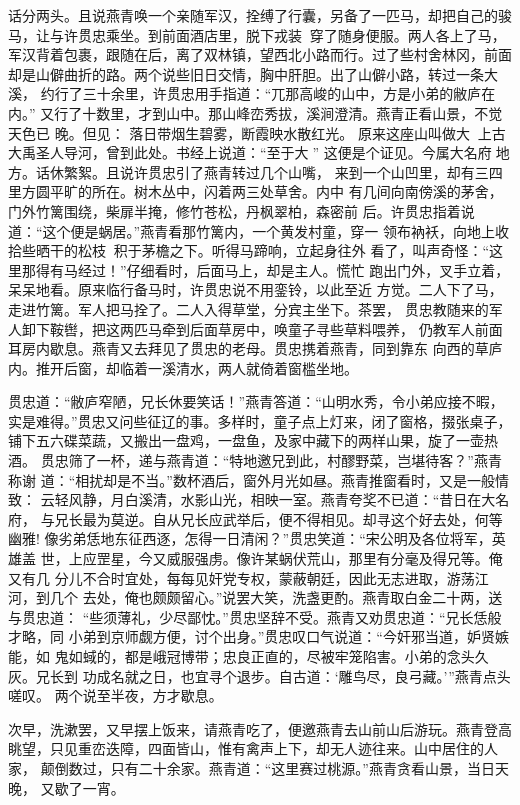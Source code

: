 话分两头。且说燕青唤一个亲随军汉，拴缚了行囊，另备了一匹马，却把自己的骏
马，让与许贯忠乘坐。到前面酒店里，脱下戎装，穿了随身便服。两人各上了马，
军汉背着包裹，跟随在后，离了双林镇，望西北小路而行。过了些村舍林冈，前面
却是山僻曲折的路。两个说些旧日交情，胸中肝胆。出了山僻小路，转过一条大溪，
约行了三十余里，许贯忠用手指道：“兀那高峻的山中，方是小弟的敝庐在内。”
又行了十数里，才到山中。那山峰峦秀拔，溪涧澄清。燕青正看山景，不觉天色已
晚。但见：
落日带烟生碧雾，断霞映水散红光。
原来这座山叫做大，上古大禹圣人导河，曾到此处。书经上说道：“至于大”
这便是个证见。今属大名府地方。话休繁絮。且说许贯忠引了燕青转过几个山嘴，
来到一个山凹里，却有三四里方圆平旷的所在。树木丛中，闪着两三处草舍。内中
有几间向南傍溪的茅舍，门外竹篱围绕，柴扉半掩，修竹苍松，丹枫翠柏，森密前
后。许贯忠指着说道：“这个便是蜗居。”燕青看那竹篱内，一个黄发村童，穿一
领布衲袄，向地上收拾些晒干的松枝积于茅檐之下。听得马蹄响，立起身往外
看了，叫声奇怪：“这里那得有马经过！”仔细看时，后面马上，却是主人。慌忙
跑出门外，叉手立着，呆呆地看。原来临行备马时，许贯忠说不用銮铃，以此至近
方觉。二人下了马，走进竹篱。军人把马拴了。二人入得草堂，分宾主坐下。茶罢，
贯忠教随来的军人卸下鞍辔，把这两匹马牵到后面草房中，唤童子寻些草料喂养，
仍教军人前面耳房内歇息。燕青又去拜见了贯忠的老母。贯忠携着燕青，同到靠东
向西的草庐内。推开后窗，却临着一溪清水，两人就倚着窗槛坐地。

贯忠道：“敝庐窄陋，兄长休要笑话！”燕青答道：“山明水秀，令小弟应接不暇，
实是难得。”贯忠又问些征辽的事。多样时，童子点上灯来，闭了窗格，掇张桌子，
铺下五六碟菜蔬，又搬出一盘鸡，一盘鱼，及家中藏下的两样山果，旋了一壶热酒。
贯忠筛了一杯，递与燕青道：“特地邀兄到此，村醪野菜，岂堪待客？”燕青称谢
道：“相扰却是不当。”数杯酒后，窗外月光如昼。燕青推窗看时，又是一般情致：
云轻风静，月白溪清，水影山光，相映一室。燕青夸奖不已道：“昔日在大名府，
与兄长最为莫逆。自从兄长应武举后，便不得相见。却寻这个好去处，何等幽雅!
像劣弟恁地东征西逐，怎得一日清闲？”贯忠笑道：“宋公明及各位将军，英雄盖
世，上应罡星，今又威服强虏。像许某蜗伏荒山，那里有分毫及得兄等。俺又有几
分儿不合时宜处，每每见奸党专权，蒙蔽朝廷，因此无志进取，游荡江河，到几个
去处，俺也颇颇留心。”说罢大笑，洗盏更酌。燕青取白金二十两，送与贯忠道：
“些须薄礼，少尽鄙忱。”贯忠坚辞不受。燕青又劝贯忠道：“兄长恁般才略，同
小弟到京师觑方便，讨个出身。”贯忠叹口气说道：“今奸邪当道，妒贤嫉能，如
鬼如蜮的，都是峨冠博带；忠良正直的，尽被牢笼陷害。小弟的念头久灰。兄长到
功成名就之日，也宜寻个退步。自古道：‘雕鸟尽，良弓藏。’”燕青点头嗟叹。
两个说至半夜，方才歇息。

次早，洗漱罢，又早摆上饭来，请燕青吃了，便邀燕青去山前山后游玩。燕青登高
眺望，只见重峦迭障，四面皆山，惟有禽声上下，却无人迹往来。山中居住的人家，
颠倒数过，只有二十余家。燕青道：“这里赛过桃源。”燕青贪看山景，当日天晚，
又歇了一宵。

